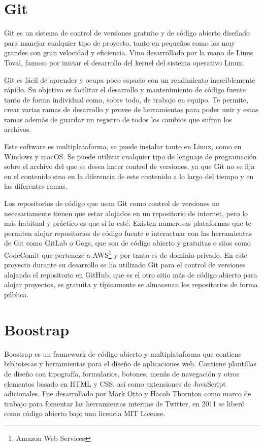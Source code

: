 \documentclass[a4paper, 12pt]{book}
\begin{document}
\section{Git} 
Git es un sistema de control de versiones gratuito y de código abierto diseñado para manejar cualquier tipo de proyecto, tanto en pequeños como los muy grandes con gran velocidad y eficiencia. Vino desarrollado por la mano de Linus Toval, famoso por iniciar el desarrollo del kernel del sistema operativo Linux. 

Git es fácil de aprender y ocupa poco espacio con un rendimiento increíblemente rápido. Su objetivo es facilitar el desarrollo y mantenimiento de código fuente tanto de forma individual como, sobre todo, de trabajo en equipo. Te permite, crear varias ramas de desarrollo y provee de herramientas para poder unir y estas ramas además de guardar un registro de todos los cambios que sufran los archivos. 

Este software es multiplataforma, se puede instalar tanto en Linux, como en Windows y macOS. Se puede utilizar cualquier tipo de lenguaje de programación sobre el archivo del que se desea hacer control de versiones, ya que Git no se fija en el contenido sino en la diferencia de este contenido a lo largo del tiempo y en las diferentes ramas. 

Los repositorios de código que usan Git como control de versiones no necesariamente tienen que estar alojados en un repositorio de internet, pero lo más habitual y práctico es que sí lo esté. Existen numerosas plataformas que te permiten alojar repositorios de código fuente e interactuar con las herramientas de Git como GitLab o Gogs, que son de código abierto y gratuitas o siios como CodeComit que perteneze a AWS\footnote{Amazon Web Services} y por tanto es de dominio privado. En este proyecto durante su desarrollo se ha utilizado Git para el control de versiones alojando el repositorio en GitHub, que es el otro sitio más de código abierto para alojar proyectos, es gratuita y típicamente se almacenan los repositorios de forma pública.


\section{Boostrap}
Boostrap es un framework de código abierto y multiplataforma que contiene bibliotecas y herramientas para el diseño de aplicaciones web. Contiene plantillas de diseño con tipografía, formularios, botones, menús de navegación y otros elementos basado en HTML y CSS, así como extensiones de JavaScript adicionales. Fue desarrollado por Mark Otto y Hacob Thornton como marco de trabajo para fomentar las herramientas internas de Twitter, en 2011 se liberó como código abierto bajo una licencia MIT License.
\end{document}
